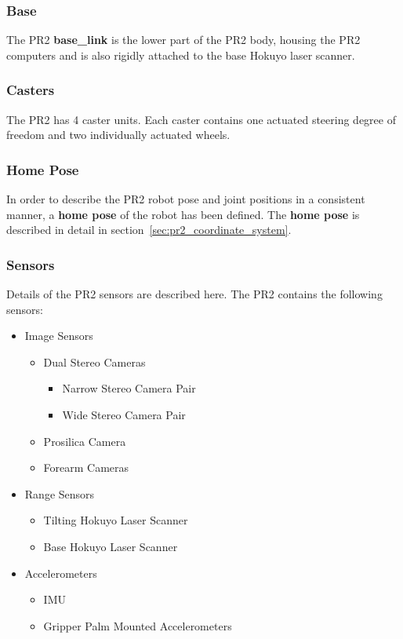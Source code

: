 \subsubsection{Base}
The PR2 {\bf base\_link} is the lower part of the PR2 body, housing the PR2 computers and is also rigidly attached to the base Hokuyo laser scanner.

\subsubsection{Casters}
The PR2 has 4 caster units.  Each caster contains one actuated steering degree of freedom and two individually actuated wheels.

\subsubsection{Home Pose}
In order to describe the PR2 robot pose and joint positions in a consistent manner, a {\bf home pose} of the robot has been defined.  The {\bf home pose} is described in detail in section~\ref{sec:pr2_coordinate_system}.

\subsubsection{Sensors}
\label{subsec:pr2_sensors}
Details of the PR2 sensors are described here.
The PR2 contains the following sensors:
\begin{itemize}
\item Image Sensors
  \begin{itemize}
  \item Dual Stereo Cameras
    \begin{itemize}
    \item Narrow Stereo Camera Pair
    \item Wide Stereo Camera Pair
    \end{itemize}
  \item Prosilica Camera
  \item Forearm Cameras
  \end{itemize}
\item Range Sensors
  \begin{itemize}
  \item Tilting Hokuyo Laser Scanner
  \item Base Hokuyo Laser Scanner
  \end{itemize}
\item Accelerometers
  \begin{itemize}
  \item IMU
  \item Gripper Palm Mounted Accelerometers
  \end{itemize}
\end{itemize}


